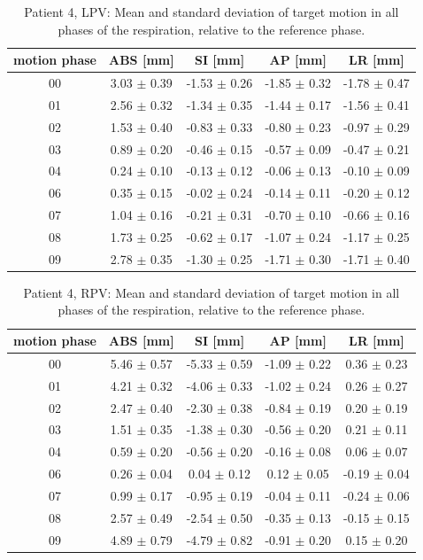 \documentclass[type=dr, dr=rernat, accentcolor=tud7b,colorbacktitle, bigchapter, openright, twoside, 12pt ]{tudthesis}
\begin{document}

\begin{table}[H]
  \centering
  \caption{Patient 4, LPV: Mean and standard deviation of target motion in all phases of the respiration, relative to the reference phase.}
  \begin{tabular}{|c|c|c|c|c|}
    \hline\hline
    motion phase & ABS [mm] & SI [mm] & AP [mm] & LR [mm]\\
    \hline 
00& 3.03 $\pm$ 0.39& -1.53 $\pm$ 0.26& -1.85 $\pm$ 0.32& -1.78 $\pm$ 0.47 \\
01& 2.56 $\pm$ 0.32& -1.34 $\pm$ 0.35& -1.44 $\pm$ 0.17& -1.56 $\pm$ 0.41 \\
02& 1.53 $\pm$ 0.40& -0.83 $\pm$ 0.33& -0.80 $\pm$ 0.23& -0.97 $\pm$ 0.29 \\
03& 0.89 $\pm$ 0.20& -0.46 $\pm$ 0.15& -0.57 $\pm$ 0.09& -0.47 $\pm$ 0.21 \\
04& 0.24 $\pm$ 0.10& -0.13 $\pm$ 0.12& -0.06 $\pm$ 0.13& -0.10 $\pm$ 0.09 \\
06& 0.35 $\pm$ 0.15& -0.02 $\pm$ 0.24& -0.14 $\pm$ 0.11& -0.20 $\pm$ 0.12 \\
07& 1.04 $\pm$ 0.16& -0.21 $\pm$ 0.31& -0.70 $\pm$ 0.10& -0.66 $\pm$ 0.16 \\
08& 1.73 $\pm$ 0.25& -0.62 $\pm$ 0.17& -1.07 $\pm$ 0.24& -1.17 $\pm$ 0.25 \\
09& 2.78 $\pm$ 0.35& -1.30 $\pm$ 0.25& -1.71 $\pm$ 0.30& -1.71 $\pm$ 0.40 \\
        \hline\hline
  \end{tabular}
\end{table}

\begin{table}[H]
  \centering
  \caption{Patient 4, RPV: Mean and standard deviation of target motion in all phases of the respiration, relative to the reference phase.}
  \begin{tabular}{|c|c|c|c|c|}
    \hline\hline
    motion phase & ABS [mm] & SI [mm] & AP [mm] & LR [mm]\\
    \hline 
00& 5.46 $\pm$ 0.57& -5.33 $\pm$ 0.59& -1.09 $\pm$ 0.22& 0.36 $\pm$ 0.23 \\
01& 4.21 $\pm$ 0.32& -4.06 $\pm$ 0.33& -1.02 $\pm$ 0.24& 0.26 $\pm$ 0.27 \\
02& 2.47 $\pm$ 0.40& -2.30 $\pm$ 0.38& -0.84 $\pm$ 0.19& 0.20 $\pm$ 0.19 \\
03& 1.51 $\pm$ 0.35& -1.38 $\pm$ 0.30& -0.56 $\pm$ 0.20& 0.21 $\pm$ 0.11 \\
04& 0.59 $\pm$ 0.20& -0.56 $\pm$ 0.20& -0.16 $\pm$ 0.08& 0.06 $\pm$ 0.07 \\
06& 0.26 $\pm$ 0.04& 0.04 $\pm$ 0.12& 0.12 $\pm$ 0.05& -0.19 $\pm$ 0.04 \\
07& 0.99 $\pm$ 0.17& -0.95 $\pm$ 0.19& -0.04 $\pm$ 0.11& -0.24 $\pm$ 0.06 \\
08& 2.57 $\pm$ 0.49& -2.54 $\pm$ 0.50& -0.35 $\pm$ 0.13& -0.15 $\pm$ 0.15 \\
09& 4.89 $\pm$ 0.79& -4.79 $\pm$ 0.82& -0.91 $\pm$ 0.20& 0.15 $\pm$ 0.20 \\
        \hline\hline
  \end{tabular}
\end{table}
\end{document}
